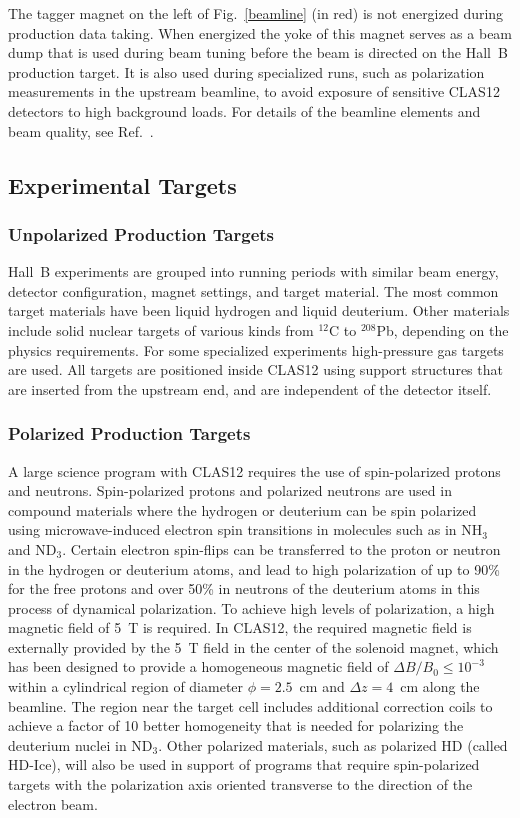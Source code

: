 \documentclass[final,3p,twocolumn]{elsarticle}
\begin{document}
The tagger magnet on the left of Fig.~\ref{beamline} (in red) is not energized during production data taking. When energized the
yoke of this magnet serves as a beam dump that is used during beam tuning before the beam is directed on the
Hall~B production target. It is also used during specialized runs, such as polarization measurements in the upstream
beamline, to avoid exposure of sensitive CLAS12 detectors to high background loads. For details of the beamline
elements and beam quality, see Ref.~\cite{beamline}.  

\subsection{Experimental Targets}

\subsubsection{Unpolarized Production Targets} 

Hall~B experiments are grouped into running periods with similar beam energy, detector configuration, magnet
settings, and target material. The most common target materials have been liquid hydrogen and liquid deuterium.
Other materials include solid nuclear targets of various kinds from $^{12}$C to $^{208}$Pb, depending on the physics
requirements. For some specialized experiments high-pressure gas targets are used. All targets are positioned
inside CLAS12 using support structures that are inserted from the upstream end, and are independent of the
detector itself. 

\subsubsection{Polarized Production Targets} 

A large science program with CLAS12 requires the use of spin-polarized protons and neutrons. Spin-polarized
protons and polarized neutrons are used in compound materials where the hydrogen or deuterium can be spin
polarized using microwave-induced electron spin transitions in molecules such as in NH$_3$ and ND$_3$. Certain
electron spin-flips can be transferred to the proton or neutron in the hydrogen or deuterium atoms, and lead to high
polarization of up to 90\% for the free protons and over 50\% in neutrons of the deuterium atoms in this process
of dynamical polarization. To achieve high levels of polarization, a high magnetic field of 5~T is required. In CLAS12,
the required magnetic field is externally provided by the 5~T field in the center of the solenoid magnet, which has
been designed to provide a homogeneous magnetic field of $\Delta B / B_0 \leq 10^{-3}$ within a cylindrical region
of diameter $\phi = 2.5$~cm and $\Delta{z} = 4$~cm along the beamline.  The region near the target cell includes
additional correction coils to achieve a factor of 10 better homogeneity that is needed for polarizing the deuterium
nuclei in ND$_3$. Other polarized materials, such as polarized HD (called HD-Ice), will also be used in support of
programs that require spin-polarized targets with the polarization axis oriented transverse to the direction of the
electron beam.        
\end{document}
